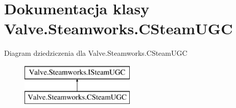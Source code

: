 \hypertarget{class_valve_1_1_steamworks_1_1_c_steam_u_g_c}{}\section{Dokumentacja klasy Valve.\+Steamworks.\+C\+Steam\+U\+GC}
\label{class_valve_1_1_steamworks_1_1_c_steam_u_g_c}
Diagram dziedziczenia dla Valve.\+Steamworks.\+C\+Steam\+U\+GC\begin{figure}[H]
\begin{center}
\leavevmode
\includegraphics[height=2.000000cm]{class_valve_1_1_steamworks_1_1_c_steam_u_g_c}
\end{center}
\end{figure}
